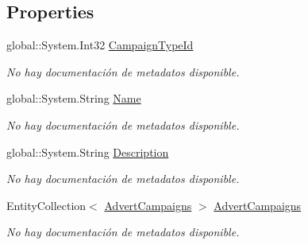 \subsection*{Properties}
\begin{DoxyCompactItemize}
\item 
global\-::\-System.\-Int32 \hyperlink{class_microsoft_1_1_samples_1_1_kinect_1_1_basic_interactions_1_1_campaign_types_ab95001b8b8ce40e625e0b108e3db9648}{Campaign\-Type\-Id}
\begin{DoxyCompactList}\small\item\em No hay documentación de metadatos disponible. \end{DoxyCompactList}\item 
global\-::\-System.\-String \hyperlink{class_microsoft_1_1_samples_1_1_kinect_1_1_basic_interactions_1_1_campaign_types_a0e4a4fa9c609db2ed87a29183f07009b}{Name}
\begin{DoxyCompactList}\small\item\em No hay documentación de metadatos disponible. \end{DoxyCompactList}\item 
global\-::\-System.\-String \hyperlink{class_microsoft_1_1_samples_1_1_kinect_1_1_basic_interactions_1_1_campaign_types_a7882fd65d9fc3055d589656231d1538e}{Description}
\begin{DoxyCompactList}\small\item\em No hay documentación de metadatos disponible. \end{DoxyCompactList}\item 
Entity\-Collection$<$ \hyperlink{class_microsoft_1_1_samples_1_1_kinect_1_1_basic_interactions_1_1_advert_campaigns}{Advert\-Campaigns} $>$ \hyperlink{class_microsoft_1_1_samples_1_1_kinect_1_1_basic_interactions_1_1_campaign_types_a1d9380eb1c0f7617cf3123bb665eaef4}{Advert\-Campaigns}
\begin{DoxyCompactList}\small\item\em No hay documentación de metadatos disponible. \end{DoxyCompactList}\end{DoxyCompactItemize}



